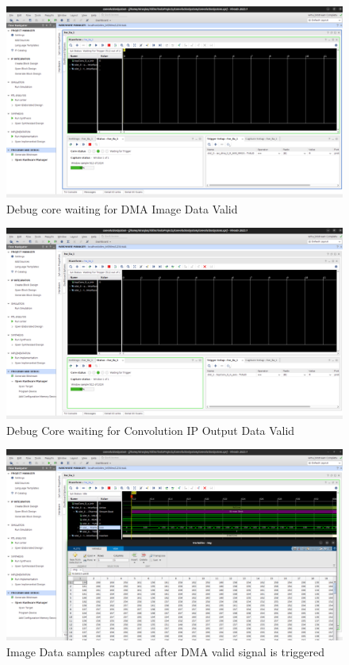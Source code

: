     \begin{figure}[H]
        \centering
        \includegraphics[width=0.87\linewidth]{images/dmaTrigger.png}
        \caption{Debug core waiting for DMA Image Data Valid}
        \label{fig:dmaTrigger}
    \end{figure}

    \begin{figure}[H]
        \centering
        \includegraphics[width=0.87\linewidth]{images/convDataTrigger.png}
        \caption{Debug Core waiting for Convolution IP Output Data Valid}
        \label{fig:convDataTrigger}
    \end{figure}

    \begin{figure}[H]
        \centering
        \includegraphics[width=1\linewidth]{images/imageDataTriggered.png}
        \caption{Image Data samples captured after DMA valid signal is triggered}
        \label{fig:imageDataTriggered}
    \end{figure}

